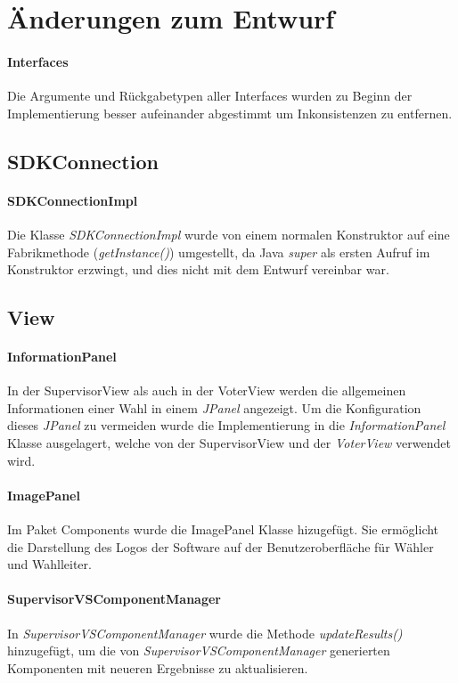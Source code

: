 \documentclass[parskip=full]{scrartcl}
\begin{document}
\section{Änderungen zum Entwurf}
\paragraph{Interfaces}
Die Argumente und Rückgabetypen aller Interfaces wurden zu Beginn der Implementierung besser aufeinander abgestimmt um Inkonsistenzen zu entfernen.

\subsection{SDKConnection}

\paragraph{SDKConnectionImpl}
Die Klasse \textit{SDKConnectionImpl} wurde von einem normalen Konstruktor auf eine Fabrikmethode (\textit{getInstance()}) umgestellt, da Java \textit{super} als ersten Aufruf im Konstruktor erzwingt, und dies nicht mit dem Entwurf vereinbar war.

\subsection{View}

\paragraph{InformationPanel}
In der SupervisorView als auch in der VoterView werden die allgemeinen Informationen einer Wahl in einem \textit{JPanel} angezeigt. Um die Konfiguration dieses \textit{JPanel} zu vermeiden wurde die Implementierung in die \textit{InformationPanel} Klasse ausgelagert, welche von der SupervisorView und der \textit{VoterView} verwendet wird.

\paragraph{ImagePanel}
Im Paket Components wurde die ImagePanel Klasse hizugefügt. Sie ermöglicht die Darstellung des Logos der Software auf der Benutzeroberfläche für Wähler und Wahlleiter. 

\paragraph{SupervisorVSComponentManager}
In \textit{SupervisorVSComponentManager} wurde die Methode \textit{updateResults()} hinzugefügt, um die von \textit{SupervisorVSComponentManager} generierten Komponenten mit neueren Ergebnisse zu aktualisieren.
\end{document}

